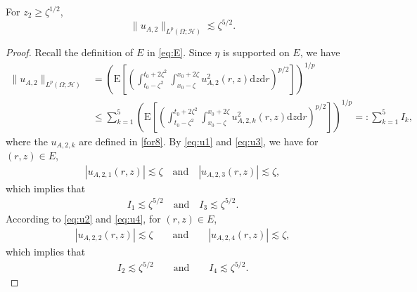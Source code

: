\documentclass[12pt,a4paper]{article}
\newcommand{\E}{\mathrm{E}}
\renewcommand{\d}{\mathrm{d}}
\newcommand {\deltah}{{\zeta}}
\newcommand{\<}{\langle}
\renewcommand{\>}{\rangle}
\begin{document}
 
  \begin{lemma}\label{lem:uA2mom}
 For $z_2\geq \deltah^{1/2}$,
 \begin{equation} \label{equ10}
 \|u_{A,2}\|_{L^p(\Omega;\mathcal{H})} \lesssim \deltah^{5/2}.
 \end{equation}
 \end{lemma}
 
 \begin{proof}
           Recall the definition of $E$ in \eqref{eq:E}.
           Since $\eta$ is supported on $E$, we have
           \begin{align*}
           \|u_{A,2}\|_{L^p(\Omega;\mathcal{H})} &= \left(\E\left[\left(\int_{t_0-\deltah^2}^{t_0+2\deltah^2}\int_{x_0-\deltah}^{x_0+2\deltah}
           u_{A,2}^{2}(r,z)\d z\d r\right)^{p/2}\right]\right)^{1/p}\\
           &\leq  \sum_{k=1}^5 \left(\E\left[\left(\int_{t_0-\deltah^2}^{t_0+2\deltah^2}\int_{x_0-\deltah}^{x_0+2\deltah}
           u_{A,2,k}^{2}(r,z)\d z\d r\right)^{p/2}\right]\right)^{1/p}
            =: \sum_{k=1}^5I_k ,
           \end{align*}
 where the $u_{A, 2, k}$ are defined in \eqref{for8}. 
           By \eqref{eq:u1} and \eqref{eq:u3},  we have for $(r,z)\in E$,
           \begin{align*}
           |u_{A,2,1}(r,z)| \lesssim \deltah \quad \text{and} \quad |u_{A,2,3}(r,z)| \lesssim \deltah,
           \end{align*}
           which implies that
           \begin{align*}
           I_1\lesssim \deltah^{5/2} \quad \text{and} \quad I_3\lesssim \deltah^{5/2}.
           \end{align*}
           According to \eqref{eq:u2} and \eqref{eq:u4},  for $(r,z)\in E$,
           \begin{align*}
           |u_{A,2,2}(r,z)| \lesssim \deltah \qquad \text{and} \qquad   |u_{A,2,4}(r,z)| \lesssim \deltah,
           \end{align*}
           which implies that
           \begin{align*}
           I_2\lesssim \deltah^{5/2} \qquad \text{and} \qquad  I_4\lesssim \deltah^{5/2}.
           \end{align*}
           

\end{proof}
\end{document}
